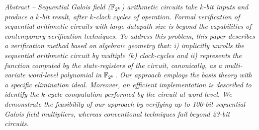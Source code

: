 {\it Abstract -- Sequential Galois field (${\mathbb{F}}_{2^k}$) arithmetic circuits
take $k$-bit inputs and produce a $k$-bit result, after $k$-clock
cycles of operation. Formal verification of sequential
arithmetic circuits with large datapath size is beyond the
capabilities of contemporary verification techniques. To address this
problem, this paper describes a verification method based on algebraic
geometry that: i) implicitly unrolls the sequential arithmetic circuit
by multiple ($k$) clock-cycles and ii) represents the function
computed by the state-registers of the circuit, canonically, as a
multi-variate word-level polynomial in ${\mathbb{F}}_{2^k}$. Our approach employs
the \Grobner basis theory with a specific elimination ideal. Moreover,
an efficient implementation is described to identify the $k$-cycle
computation performed  by the circuit at word-level. We demonstrate
the feasibility of our approach by verifying up to 100-bit sequential
Galois field multipliers, whereas conventional techniques fail beyond
23-bit circuits.  }
